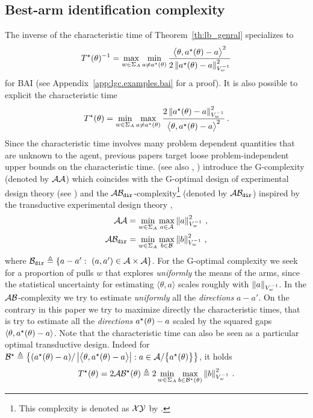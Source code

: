 \subsection{Best-arm identification complexity}
The inverse of the characteristic time of Theorem~\ref{th:lb_genral} specializes to
\[
T^{\star}(\theta)^{-1} = \max_{w\in\Sigma_A} \min_{a\neq a^\star(\theta)} \frac{\big\langle \theta, a^\star(\theta)-a\big\rangle^2}{2 \left\lVert a^\star(\theta)-a\right\rVert_{V_w^{-1}}^2}
\]
for BAI (see Appendix~\ref{app:lgc.examples.bai} for a proof). It is also possible to explicit the characteristic time
\[
T^{\star}(\theta) = \min_{w\in\Sigma_A} \max_{a\neq a^\star(\theta)} \frac{2\left\lVert a^\star(\theta)-a\right\rVert_{V_w^{-1}}^2}{\big\langle \theta, a^\star(\theta)-a\big\rangle^2}\,.
\]
Since the characteristic time involves many problem dependent quantities that are unknown to the agent, previous papers target loose problem-independent upper bounds on the characteristic time. \citet{soare2014linear} (see also \citealt{tao2018alba}, \citealt{fiez2019transductive}) introduce the G-complexity (denoted by $\mathcal{A}\mathcal{A}$) which coincides with the G-optimal design of experimental design theory (see \citealt{pukelsheim2006optimal}) and the $\mathcal{A}\mathcal{B}_{\texttt{dir}}$-complexity\footnote{This complexity is denoted as $\mathcal{X}\mathcal{Y}$ by \citet{soare2014linear}.} (denoted by $\mathcal{A}\mathcal{B}_{\texttt{dir}}$) inspired by the transductive experimental design theory  \citep{yu2006active},
\begin{align*}
\mathcal{A}\mathcal{A} &=\min_{w\in\Sigma_A} \max_{a\in\mathcal{A}} \left\lVert a\right\rVert_{V_w^{-1}}^2\,,\\
\mathcal{A}\mathcal{B}_{\texttt{dir}} &=\min_{w\in\Sigma_A} \max_{b\in\mathcal{B}} \left\lVert b\right\rVert_{V_w^{-1}}^2\,,
\end{align*}
where $\cB_{\texttt{dir}}\eqdef\{a-a':\ (a,a')\in\cA\times\cA\}$. For the G-optimal complexity we seek for a proportion of pulls $w$ that explores \emph{uniformly} the means of the arms, since the statistical uncertainty for estimating $\langle \theta,a\rangle$ scales roughly with $\left\lVert a\right\rVert_{V_w^{-1}}$. In the $\mathcal{A}\mathcal{B}$-complexity we try to estimate \emph{uniformly} all the \emph{directions} $a-a'$. On the contrary in this paper we try to maximize directly the characteristic times, that is try to estimate all the \emph{directions} $a^\star(\theta) - a$ scaled by the squared gaps $\langle\theta,a^\star(\theta)-a\rangle$.
Note that the characteristic time can also be seen as a particular optimal transductive design. Indeed for $\mathcal{B}^\star \triangleq \left\{ (a^\star(\theta)- a)/\left|\big\langle \theta, a^\star(\theta)-a\big\rangle\right|: a\in\mathcal{A}/\big\{a^\star(\theta)\big\}  \right\}$, it holds
\[
T^{\star}(\theta) = 2 \mathcal{A}\mathcal{B}^\star(\theta) \triangleq 2 \min_{w\in\Sigma_A} \max_{b\in\mathcal{B}^\star(\theta)} \left\lVert b\right\rVert_{V_w^{-1}}^2\,.
\]
